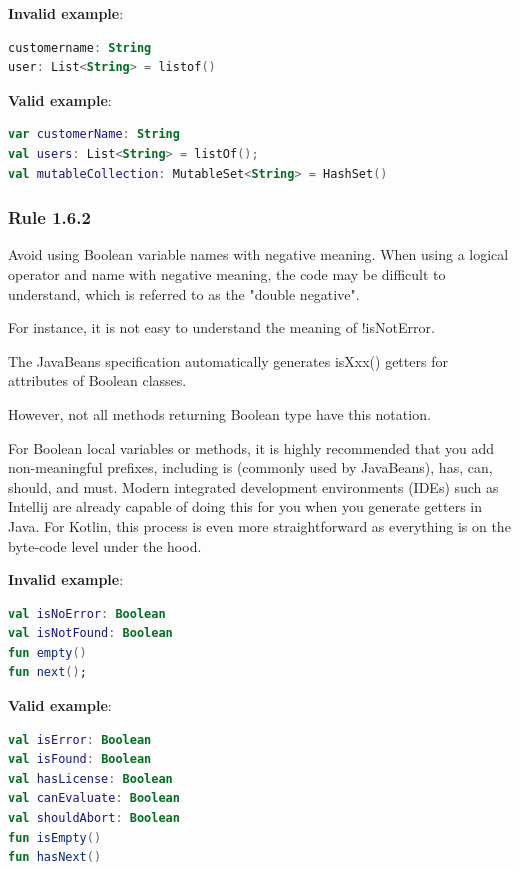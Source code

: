 \textbf{Invalid example}:

\begin{lstlisting}[language=Kotlin]
customername: String
user: List<String> = listof()
\end{lstlisting}


\textbf{Valid example}:

\begin{lstlisting}[language=Kotlin]
var customerName: String
val users: List<String> = listOf();
val mutableCollection: MutableSet<String> = HashSet()
\end{lstlisting}


\subsubsection*{\textbf{Rule 1.6.2}}
\leavevmode\newline



Avoid using Boolean variable names with negative meaning. When using a logical operator and name with negative meaning, the code may be difficult to understand, which is referred to as the "double negative".

For instance, it is not easy to understand the meaning of !isNotError.

The JavaBeans specification automatically generates isXxx() getters for attributes of Boolean classes.

However, not all methods returning Boolean type have this notation.

For Boolean local variables or methods, it is highly recommended that you add non-meaningful prefixes, including is (commonly used by JavaBeans), has, can, should, and must. Modern integrated development environments (IDEs) such as Intellij are already capable of doing this for you when you generate getters in Java. For Kotlin, this process is even more straightforward as everything is on the byte-code level under the hood.



\textbf{Invalid example}:

\begin{lstlisting}[language=Kotlin]
val isNoError: Boolean
val isNotFound: Boolean
fun empty()
fun next();
\end{lstlisting}


\textbf{Valid example}:

\begin{lstlisting}[language=Kotlin]
val isError: Boolean
val isFound: Boolean
val hasLicense: Boolean
val canEvaluate: Boolean
val shouldAbort: Boolean
fun isEmpty()
fun hasNext()
\end{lstlisting}

